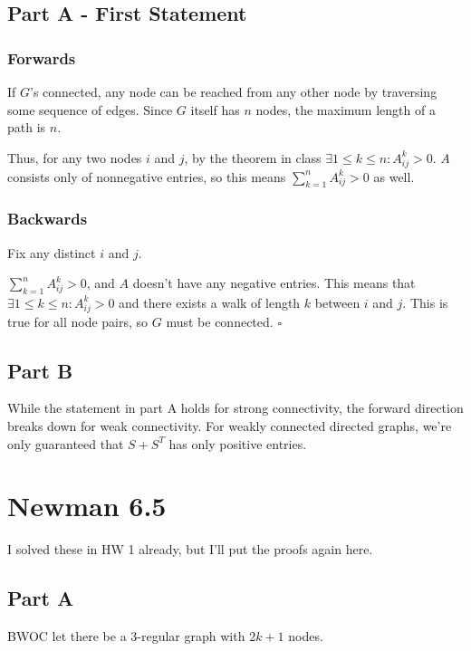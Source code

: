 \documentclass[12pt]{article}
\begin{document}
\subsection{Part A - First Statement}

\subsubsection{Forwards}

If $G$'s connected, any node can be reached from any other node by traversing
some sequence of edges.
Since $G$ itself has $n$ nodes, the maximum length of a path is $n$.

Thus, for any two nodes $i$ and $j$, by the theorem in class $\exists 1 \le k \le n: A^k_{ij} > 0$.
$A$ consists only of nonnegative entries, so this means $\sum_{k=1}^{n} A^k_{ij} > 0$ as well.

\subsubsection{Backwards}

Fix any distinct $i$ and $j$.

$\sum_{k=1}^{n} A^k_{ij} > 0$, and $A$ doesn't have any negative entries.
This means that $\exists 1 \le k \le n: A^k_{ij} > 0$
and there exists a walk of length $k$ between $i$ and $j$.
This is true for all node pairs, so $G$ must be connected. $\square$

\subsection{Part B}

While the statement in part A holds for strong connectivity,
the forward direction breaks down for weak connectivity.
For weakly connected directed graphs, we're only guaranteed that $S+S^T$
has only positive entries.

\section{Newman 6.5}

I solved these in HW 1 already, but I'll put the proofs again here.

\subsection{Part A}

BWOC let there be a 3-regular graph with $2k+1$ nodes.
\end{document}
